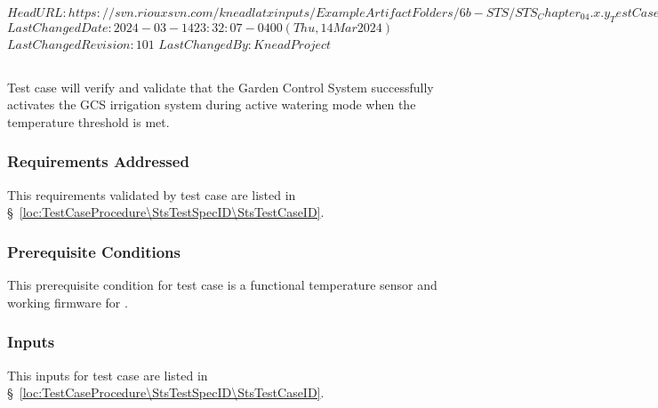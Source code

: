 \svnidlong
{$HeadURL: https://svn.riouxsvn.com/kneadlatxinputs/ExampleArtifactFolders/6b-STS/STS_Chapter_04.x.y_TestCaseBase.tex $}
{$LastChangedDate: 2024-03-14 23:32:07 -0400 (Thu, 14 Mar 2024) $}
{$LastChangedRevision: 101 $}
{$LastChangedBy: KneadProject $}

\subsection{\StsTestCaseID}
\label{loc:Test\StsTestCaseID}
% 

Test  case  will verify and validate that the Garden Control System successfully 
activates the GCS irrigation system during active watering mode when the temperature threshold is met.

\subsubsection{Requirements Addressed}
\label{loc:TestCaseRequirementsAddressed\StsTestSpecID\StsTestCaseID}
% 

This requirements validated by test  case  are listed in \S~\ref{loc:TestCaseProcedure\StsTestSpecID\StsTestCaseID}.

\subsubsection{Prerequisite Conditions}
\label{loc:TestCasePrerequisiteConditions\StsTestSpecID\StsTestCaseID}
% 

This prerequisite condition for test  case  is a functional temperature sensor and working firmware for \ThisSys.

\subsubsection{Inputs}
\label{loc:TestCaseInputs\StsTestSpecID\StsTestCaseID}
% 

This inputs for test  case  are listed in \S~\ref{loc:TestCaseProcedure\StsTestSpecID\StsTestCaseID}.

